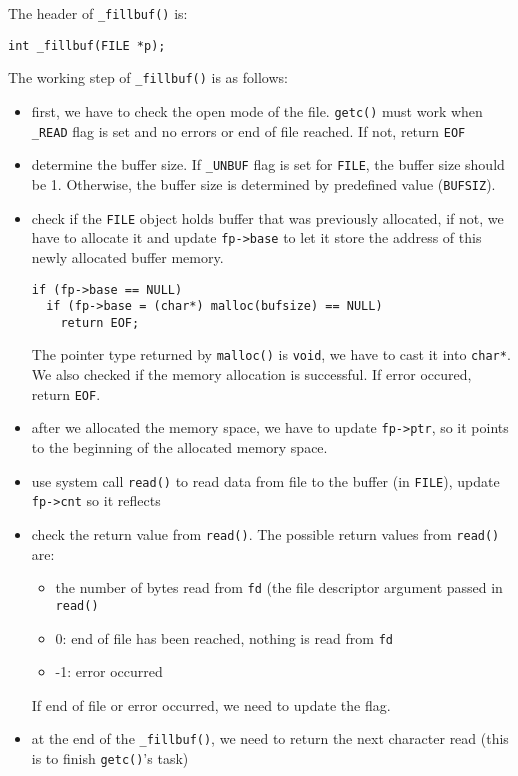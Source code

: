 \documentclass[12pt]{article}
\begin{document}
The header of \texttt{\_fillbuf()} is:
\begin{verbatim}
int _fillbuf(FILE *p);
\end{verbatim}

The working step of \texttt{\_fillbuf()} is as follows:
\begin{itemize}
\item first, we have to check the open mode of the file. \texttt{getc()} must work when \texttt{\_READ} flag is set and no errors or end of file reached. If not, return \texttt{EOF}
\item determine the buffer size. If \texttt{\_UNBUF} flag is set for \texttt{FILE}, the buffer size should be 1. Otherwise, the buffer size is determined by predefined value (\texttt{BUFSIZ}).
\item check if the \texttt{FILE} object holds buffer that was previously allocated, if not, we have to allocate it and update \texttt{fp->base} to let it store the address of this newly allocated buffer memory.
\begin{verbatim}
if (fp->base == NULL)
  if (fp->base = (char*) malloc(bufsize) == NULL)
    return EOF;
\end{verbatim}

The pointer type returned by \texttt{malloc()} is \texttt{void}, we have to cast it into \texttt{char*}. We also checked if the memory allocation is successful. If error occured, return \texttt{EOF}.
\item after we allocated the memory space, we have to update \texttt{fp->ptr}, so it points to the beginning of the allocated memory space.
\item use system call \texttt{read()} to read data from file to the buffer (in \texttt{FILE}), update \texttt{fp->cnt} so it reflects
\item check the return value from \texttt{read()}. The possible return values from \texttt{read()} are:
\begin{itemize}
\item the number of bytes read from \texttt{fd} (the file descriptor argument passed in \texttt{read()}
\item 0: end of file has been reached, nothing is read from \texttt{fd}
\item -1: error occurred
\end{itemize}
If end of file or error occurred, we need to update the flag.
\item at the end of the \texttt{\_fillbuf()}, we need to return the next character read (this is to finish \texttt{getc()}'s task)
\end{itemize}
\end{document}
